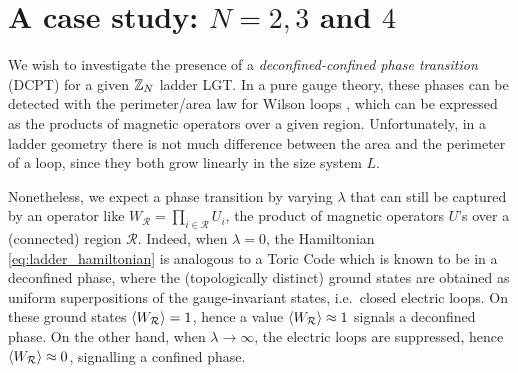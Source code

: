 \section{A case study: \texorpdfstring{$N=2, 3$}{N=2, 3} and \texorpdfstring{$4$}{4}}
\label{sec:a_case_study_N_2_3_4}

\newcommand{\ZTwoWilsonGraph}[1]{
        \nextgroupplot
        \addplot+[thick] table [y=10x2] {assets/graphs/data/Z2_wilson_#1.csv};
        \addplot+[thick] table [y=12x2] {assets/graphs/data/Z2_wilson_#1.csv};
        \addplot+[thick] table [y=14x2] {assets/graphs/data/Z2_wilson_#1.csv};
        \addplot+[thick] table [y=16x2] {assets/graphs/data/Z2_wilson_#1.csv};
        \addplot+[thick] table [y=18x2] {assets/graphs/data/Z2_wilson_#1.csv};
}
\newcommand{\ZThreeWilsonGraph}[1]{
        \nextgroupplot
        \addplot+[thick] table [y=7x2]  {assets/graphs/data/Z3_wilson_#1.csv};
        \addplot+[thick] table [y=9x2]  {assets/graphs/data/Z3_wilson_#1.csv};
        \addplot+[thick] table [y=11x2] {assets/graphs/data/Z3_wilson_#1.csv};
        \addplot+[thick] table [y=13x2] {assets/graphs/data/Z3_wilson_#1.csv};
}
\newcommand{\ZFourWilsonGraph}[1]{
    \nextgroupplot
    \addplot+ [thick] table [y=6x2]  {assets/graphs/data/Z4_wilson_#1.csv};
    \addplot+ [thick] table [y=8x2]  {assets/graphs/data/Z4_wilson_#1.csv};
    \addplot+ [thick] table [y=10x2] {assets/graphs/data/Z4_wilson_#1.csv};
}









We wish to investigate the presence of a \emph{deconfined-confined phase transition} (DCPT) for a given $\mathbb{Z}_N$ ladder LGT.
In a pure gauge theory, these phases can be detected
with the perimeter/area law for Wilson loops \cite{wilson1974confinement},
which can be expressed as the products of magnetic operators over a given region.
Unfortunately, in a  ladder geometry there is not much difference between the area and the perimeter of a loop, since they both grow linearly in the size system $L$.

Nonetheless, we expect a phase transition by varying $\lambda$ \cite{trebst2007topological, hamma2008adiabatic, tagliacozzo2011entanglement} that can still be captured by an operator like $W_{\mathcal{R}}= \prod_{i \in \mathcal{R}} U_{i}$, the product of magnetic operators $U$'s over a (connected) region $\mathcal{R}$.
Indeed, when $\lambda=0$, the Hamiltonian \eqref{eq:ladder_hamiltonian} is analogous to a Toric Code \cite{kitaev2003fault} which is known to be in a deconfined phase, where the (topologically distinct) ground states are obtained as uniform superpositions of the gauge-invariant states, i.e.~closed electric loops.
On these ground states $\ev{W_{\mathcal{R}}} = 1$, hence
 a value $\ev{W_{\mathcal{R}}} \approx 1$ signals a deconfined phase.
On the other hand, when $\lambda \rightarrow \infty$, the electric loops are suppressed, hence
$\ev{W_{\mathcal{R}}} \approx 0$, signalling a confined phase.


